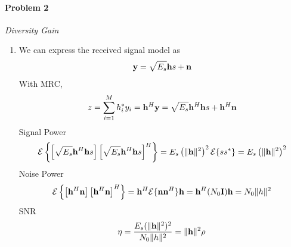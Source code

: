 \documentclass[12pt]{article}
\begin{document}
\paragraph{Problem 2} {\it Diversity Gain} 
\begin{enumerate}
\item
We can express the received signal model as
\begin{equation*}
{\bf y} = \sqrt{E_s} {\bf h} s + {\bf n}
\end{equation*}
With MRC,
$$
z  =  \sum_{i=1}^M h_i^* y_i  =   {\bf h}^H {\bf y}  = \sqrt{E_s} {\bf h}^H {\bf h}s + {\bf h}^H {\bf n}
$$
Signal Power
\begin{eqnarray*}
{\cal E}\left \{ \left [ \sqrt{E_s} {\bf h}^H {\bf h}s   \right] \left[ \sqrt{E_s} {\bf h}^H {\bf h}s \right] ^H \right \}
=E_s \left( \Vert  {\bf h} \Vert  ^2\right)^2 {\cal E} \{s s^*\} 
= E_s \left( \Vert  {\bf h} \Vert  ^2 \right)^2
\end{eqnarray*}
Noise Power
\begin{eqnarray*}
{\cal E} \left \{ \left [ {\bf h}^H {\bf n} \right]\left [ {\bf h}^H {\bf n} \right]^H \right \}= {\bf h}^H {\cal E} \{ {\bf n n}^H \} {\bf h}= {\bf h}^H ( N_0 {\bf I}) {\bf h} = N_0 \Vert h\Vert ^2
\end{eqnarray*}
SNR
\begin{eqnarray*}
\eta 
= \frac { E_s ( \Vert  {\bf h} \Vert  ^2)^2 } {N_0 \Vert h\Vert ^2} 
=  \Vert {\bf h}\Vert ^2 \rho 
\end{eqnarray*}


\end{enumerate}
\end{document}
